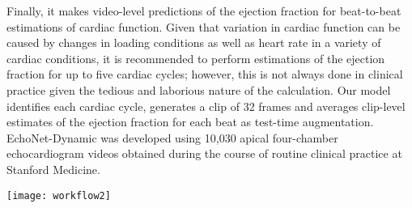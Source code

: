 Finally, it makes video-level predictions of the ejection fraction for beat-to-beat estimations of cardiac function. Given that variation in cardiac function can be caused by changes in loading conditions as well as heart rate in a variety of cardiac conditions, it is recommended to perform estimations of the ejection fraction for up to five cardiac cycles; however, this is not always done in clinical practice given the tedious and laborious nature of the calculation. Our model identifies each cardiac cycle, generates a clip of 32 frames and averages clip-level estimates of the ejection fraction for each beat as test-time augmentation. EchoNet-Dynamic was developed using 10,030 apical four-chamber echocardiogram videos obtained during the course of routine clinical practice at Stanford Medicine.

\begin{figure*}[h]
\centering
\texttt{[image: workflow2]}
\label{distillation}
\end{figure*}